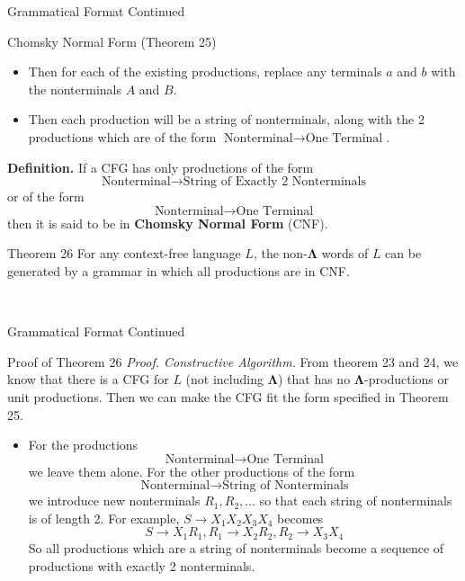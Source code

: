 \documentclass{article}
\begin{document}
\begin{multicols*}{3}
\begin{blackbox}{Grammatical Format Continued}
\begin{brownbox}{Chomsky Normal Form (Theorem 25)}
\begin{itemize}[leftmargin=5pt]
                \item Then for each of the existing productions, replace any terminals $a$ and $b$ with the nonterminals $A$ and $B$.
                \item Then each production will be a string of nonterminals, along with the 2 productions which are of the form $\text{Nonterminal} \rightarrow \text{One Terminal}$.
            \end{itemize}
        \end{brownbox}
        \textbf{Definition.} If a CFG has only productions of the form \\[-3ex]
        \[\text{Nonterminal} \rightarrow \text{String of Exactly 2 Nonterminals}\]
        or of the form \\[-3ex]
        \[\text{Nonterminal} \rightarrow \text{One Terminal}\]
        then it is said to be in \textbf{Chomsky Normal Form} (CNF).
        \begin{bluebox}{Theorem 26}
            For any context-free language $L$, the non-$\boldsymbol{\Lambda}$ words of $L$ can be generated by a grammar in which all productions are in CNF.
        \end{bluebox}\\[-2ex]
\end{blackbox}
\begin{blackbox}{Grammatical Format Continued}
    \begin{bluebox}{Proof of Theorem 26}
        \textit{Proof. Constructive Algorithm.} From theorem 23 and 24, we know that there is a CFG for $L$ (not including $\boldsymbol{\Lambda}$) that has no $\boldsymbol{\Lambda}$-productions or unit productions. Then we can make the CFG fit the form specified in Theorem 25.
        \begin{itemize}[leftmargin=5pt]
            \item For the productions 
            \[\text{Nonterminal} \rightarrow \text{One Terminal}\]
            we leave them alone.
            For the other productions of the form \\[-1ex]
            \[\text{Nonterminal} \rightarrow \text{String of Nonterminals}\]
            we introduce new nonterminals $R_1,R_2,\ldots$ so that each string of nonterminals is of length 2. For example, $S \rightarrow X_1X_2X_3X_4$ becomes\\[-1ex]
            \[S \rightarrow X_1R_1, R_1 \rightarrow X_2R_2, R_2 \rightarrow X_3X_4\]
            So all productions which are a string of nonterminals become a sequence of productions with exactly 2 nonterminals.

\end{itemize}
\end{bluebox}
\end{blackbox}
\end{multicols*}
\end{document}
